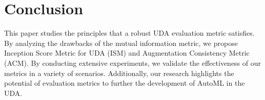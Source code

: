 \documentclass{article} %
\begin{document}


\section{Conclusion}

This paper studies the principles that a robust UDA evaluation metric satisfies. By analyzing the drawbacks of the mutual information metric, we propose Inception Score Metric for UDA (ISM) and Augmentation Consistency Metric (ACM). By conducting extensive experiments, we validate the effectiveness of our metrics in a variety of scenarios. Additionally, our research highlights the potential of evaluation metrics to further the development of AutoML in the UDA.

	
	

\clearpage
\appendix


\end{document}
